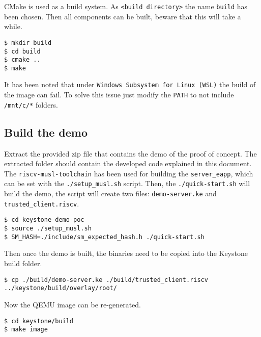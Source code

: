 CMake \cite{cmake} is used as a build system. As \texttt{<build directory>} the name \texttt{build} has been chosen. Then all components can be built, beware that this will take a while. \\
\begin{lstlisting}[style=terminal,frame=single]
$ mkdir build
$ cd build
$ cmake ..
$ make
\end{lstlisting}
\begin{mybox}
\faExclamation\enspace It has been noted that under \texttt{Windows Subsystem for Linux (WSL)} the build of the image can fail. To solve this issue just modify the \texttt{PATH} to not include \texttt{/mnt/c/*} folders.
\end{mybox}

\subsection{Build the demo}
Extract the provided zip file that contains the demo of the proof of concept. The extracted folder should contain the developed code explained in this document. The \texttt{riscv-musl-toolchain} has been used for building the \texttt{server\_eapp}, which can be set with the \texttt{./setup\_musl.sh} script. Then, the \texttt{./quick-start.sh} will build the demo, the script will create two files: \texttt{demo-server.ke} and \texttt{trusted\_client.riscv}. \\
\begin{lstlisting}[style=terminal,frame=single]
$ cd keystone-demo-poc
$ source ./setup_musl.sh
$ SM_HASH=./include/sm_expected_hash.h ./quick-start.sh
\end{lstlisting}
Then once the demo is built, the binaries need to be copied into the Keystone build folder. \\

\begin{lstlisting}[style=terminal,frame=single]
$ cp ./build/demo-server.ke ./build/trusted_client.riscv ../keystone/build/overlay/root/
\end{lstlisting}
Now the QEMU image can be re-generated. \\

\begin{lstlisting}[style=terminal,frame=single]
$ cd keystone/build
$ make image
\end{lstlisting}

